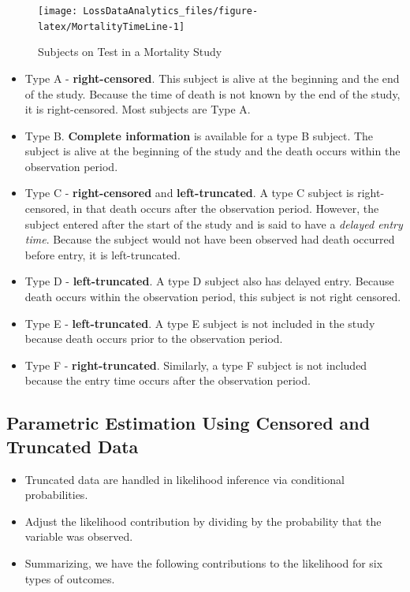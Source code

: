 \documentclass[]{book}
\begin{document}
\begin{figure}

{\centering \texttt{[image: LossDataAnalytics\_files/figure-latex/MortalityTimeLine-1]} 

}

\caption{Subjects on Test in a Mortality Study}\label{fig:MortalityTimeLine}
\end{figure}

\begin{itemize}
\item
  Type A - \textbf{right-censored}. This subject is alive at the
  beginning and the end of the study. Because the time of death is not
  known by the end of the study, it is right-censored. Most subjects are
  Type A.
\item
  Type B. \textbf{Complete information} is available for a type B
  subject. The subject is alive at the beginning of the study and the
  death occurs within the observation period.
\item
  Type C - \textbf{right-censored} and \textbf{left-truncated}. A type C
  subject is right-censored, in that death occurs after the observation
  period. However, the subject entered after the start of the study and
  is said to have a \emph{delayed entry time}. Because the subject would
  not have been observed had death occurred before entry, it is
  left-truncated.
\item
  Type D - \textbf{left-truncated}. A type D subject also has delayed
  entry. Because death occurs within the observation period, this
  subject is not right censored.
\item
  Type E - \textbf{left-truncated}. A type E subject is not included in
  the study because death occurs prior to the observation period.
\item
  Type F - \textbf{right-truncated}. Similarly, a type F subject is not
  included because the entry time occurs after the observation period.
\end{itemize}

\subsection{Parametric Estimation Using Censored and Truncated
Data}\label{parametric-estimation-using-censored-and-truncated-data}

\begin{itemize}
\item
  Truncated data are handled in likelihood inference via conditional
  probabilities.
\item
  Adjust the likelihood contribution by dividing by the probability that
  the variable was observed.
\item
  Summarizing, we have the following contributions to the likelihood for
  six types of outcomes.
\end{itemize}
\end{document}

